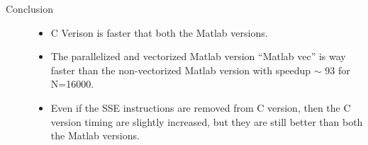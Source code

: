 \documentclass[10pt,twoside]{article}
\begin{document}
 \begin{description}
    \item[Conclusion] \hfill 
      \begin{itemize}
        \item C Verison is faster that both the Matlab versions.  
        \item The parallelized and vectorized Matlab version ``Matlab vec'' is way faster than the non-vectorized Matlab version with speedup $\sim$ 93 for N=16000.
        \item Even if the SSE instructions are removed from C version, then the C version timing are slightly increased, but they are still better than both the Matlab versions.  
      \end{itemize}
  \end{description}
\end{document}

